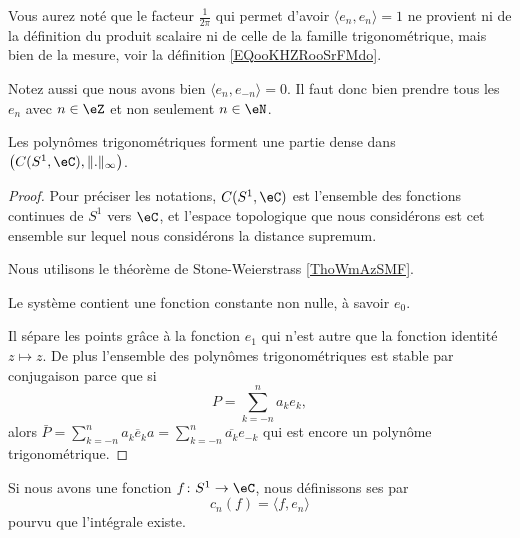 \begin{remark}
	Vous aurez noté que le facteur \( \frac{1}{ 2\pi }\) qui permet d'avoir \( \langle e_n, e_n\rangle=1 \) ne provient ni de la définition du produit scalaire ni de celle de la famille trigonométrique, mais bien de la mesure, voir la définition \ref{EQooKHZRooSrFMdo}.
\end{remark}

\begin{remark}      \label{REMooUCANooVyXPxj}
	Notez aussi que nous avons bien \( \langle e_n, e_{-n}\rangle =0\). Il faut donc bien prendre tous les \( e_n\) avec \( n\in \eZ\) et non seulement \( n\in \eN\).
\end{remark}

\begin{proposition}     \label{PROPooTGBHooXGhdPR}
	Les polynômes trigonométriques forment une partie dense dans \( \big( C(S^1,\eC),\| . \|_{\infty} \big)\).
\end{proposition}

\begin{proof}
	Pour préciser les notations, \( C(S^1,\eC)\) est l'ensemble des fonctions continues de \( S^1\) vers \( \eC\), et l'espace topologique que nous considérons est cet ensemble sur lequel nous considérons la distance supremum.

	Nous utilisons le théorème de Stone-Weierstrass \ref{ThoWmAzSMF}.

	Le système contient une fonction constante non nulle, à savoir \( e_0\).

	Il sépare les points grâce à la fonction \( e_1\) qui n'est autre que la fonction identité \( z\mapsto z\). De plus l'ensemble des polynômes trigonométriques est stable par conjugaison parce que si
	\begin{equation}
		P=\sum_{k=-n}^na_ke_k,
	\end{equation}
	alors \( \bar P=\sum_{k=-n}^n\overline{ a_k e_ka}=\sum_{k=-n}^n\overline{ a_k }e_{-k}\) qui est encore un polynôme trigonométrique.
\end{proof}

\begin{definition}
	Si nous avons une fonction \( f\colon S^1\to \eC\), nous définissons ses  par
	\begin{equation}
		c_n(f)=\langle f, e_n\rangle
	\end{equation}
	pourvu que l'intégrale existe.
\end{definition}

